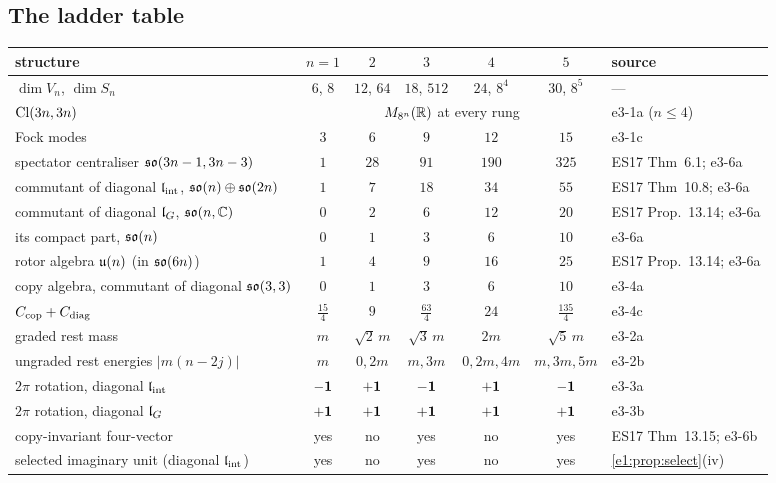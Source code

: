 \subsection{The ladder table}
\label{e3:sec:table}

\begin{table}[t]
\centering
\footnotesize
\setlength{\tabcolsep}{4pt}
\begin{tabular}{@{}>{\raggedright\arraybackslash}p{4.7cm}ccccc>{\raggedright\arraybackslash}p{2.7cm}@{}}
\toprule
structure & $n=1$ & $2$ & $3$ & $4$ & $5$ & source\\
\midrule
$\dim V_n$, $\dim S_n$ & $6$, $8$ & $12$, $64$ & $18$, $512$ & $24$, $8^4$ & $30$, $8^5$ & ---\\
$\mathrm{Cl}(3n,3n)$ & \multicolumn{5}{c}{$M_{8^n}(\mathbb{R})$ at every rung} & e3-1a ($n\le4$)\\
Fock modes & $3$ & $6$ & $9$ & $12$ & $15$ & e3-1c\\
spectator centraliser $\mathfrak{so}(3n-1,3n-3)$ & $1$ & $28$ & $91$ & $190$ & $325$ & ES17 Thm~6.1; e3-6a\\
commutant of diagonal $\mathfrak l_{\rm int}$, $\mathfrak{so}(n)\oplus\mathfrak{so}(2n)$ & $1$ & $7$ & $18$ & $34$ & $55$ & ES17 Thm~10.8; e3-6a\\
commutant of diagonal $\mathfrak l_G$, $\mathfrak{so}(n,\mathbb{C})$ & $0$ & $2$ & $6$ & $12$ & $20$ & ES17 Prop.~13.14; e3-6a\\
its compact part, $\mathfrak{so}(n)$ & $0$ & $1$ & $3$ & $6$ & $10$ & e3-6a\\
rotor algebra $\mathfrak{u}(n)$ (in $\mathfrak{so}(6n)$) & $1$ & $4$ & $9$ & $16$ & $25$ & ES17 Prop.~13.14; e3-6a\\
copy algebra, commutant of diagonal $\mathfrak{so}(3,3)$ & $0$ & $1$ & $3$ & $6$ & $10$ & e3-4a\\
$C_{\rm cop}+C_{\rm diag}$ & $\tfrac{15}4$ & $9$ & $\tfrac{63}4$ & $24$ & $\tfrac{135}4$ & e3-4c\\
graded rest mass & $m$ & $\sqrt2\,m$ & $\sqrt3\,m$ & $2m$ & $\sqrt5\,m$ & e3-2a\\
ungraded rest energies $|m(n-2j)|$ & $m$ & $0,2m$ & $m,3m$ & $0,2m,4m$ & $m,3m,5m$ & e3-2b\\
$2\pi$ rotation, diagonal $\mathfrak l_{\rm int}$ & $-\mathbf 1$ & $+\mathbf 1$ & $-\mathbf 1$ & $+\mathbf 1$ & $-\mathbf 1$ & e3-3a\\
$2\pi$ rotation, diagonal $\mathfrak l_G$ & $+\mathbf 1$ & $+\mathbf 1$ & $+\mathbf 1$ & $+\mathbf 1$ & $+\mathbf 1$ & e3-3b\\
copy-invariant four-vector & yes & no & yes & no & yes & ES17 Thm~13.15; e3-6b\\
selected imaginary unit (diagonal $\mathfrak l_{\rm int}$) & yes & no & yes & no & yes & \cref{e1:prop:select}(iv)\\

\end{tabular}
\end{table}
